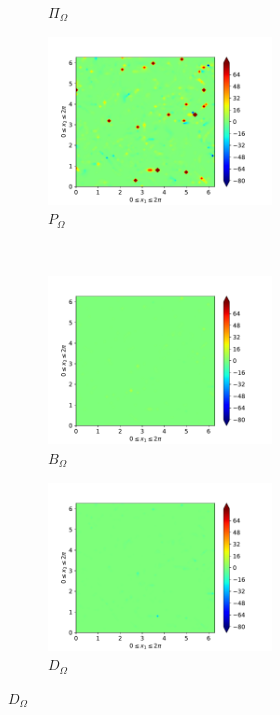 \begin{figure}[H]
\begin{subfigure}{0.45\textwidth}
        \caption{$\Pi_{\Omega}$}
    \end{subfigure}
    \newline
    \begin{subfigure}{0.45\textwidth}
        \includegraphics[height=1.75in]{media/run-cds-65/P-enst-1360}
        \caption{$P_{\Omega}$}
    \end{subfigure}
    ~
    \begin{subfigure}{0.45\textwidth}
        \includegraphics[height=1.75in]{media/run-cds-65/B-enst-1360}
        \caption{$B_{\Omega}$}
    \end{subfigure}
    \newline
    \begin{subfigure}{0.45\textwidth}
        \includegraphics[height=1.75in]{media/run-cds-65/D-enst-1360}
        \caption{$D_{\Omega}$}
    \end{subfigure}
\end{figure}

\newpage

